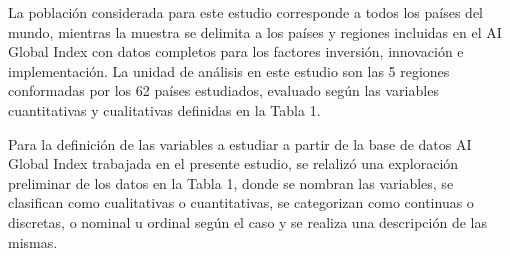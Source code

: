 \documentclass[
]{article}
\begin{document}
\begin{multicols}{2}
La población considerada para este estudio corresponde a todos los países del mundo, mientras la muestra se delimita a los países y regiones incluidas en el AI Global Index con datos completos para los factores inversión, innovación e implementación. La unidad de análisis en este estudio son las 5 regiones conformadas por los 62 países estudiados, evaluado según las variables cuantitativas y cualitativas definidas en la Tabla 1. 

Para la definición de las variables a estudiar a partir de la base de datos AI Global Index trabajada en el presente estudio, se relalizó una exploración preliminar de los datos en la Tabla 1, donde se nombran las variables, se clasifican como cualitativas o cuantitativas, se categorizan como continuas o discretas, o nominal u ordinal según el caso y se realiza una descripción de las mismas.\\


\end{multicols}
\end{document}
